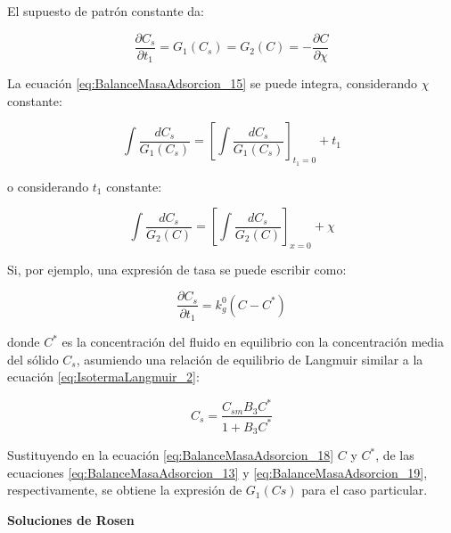 \documentclass[11pt]{book}
\begin{document}
El supuesto de patrón constante da:

\begin{equation}
    \label{eq:BalanceMasaAdsorcion_15}
    \frac{\partial C_s}{\partial t_1} = G_1 (C_s) = G_2(C) = - \frac{\partial C}{\partial \chi}
\end{equation}

La ecuación \ref{eq:BalanceMasaAdsorcion_15} se puede integra, considerando $\chi$ constante:

\begin{equation}
    \label{eq:BalanceMasaAdsorcion_16}
    \int \frac{dC_s}{G_1(C_s)} = \left[ \int \frac{dC_s}{G_1(C_s)} \right]_{t_1 = 0} + t_1
\end{equation}

o considerando $t_1$ constante:

\begin{equation}
    \label{eq:BalanceMasaAdsorcion_17}
    \int \frac{dC_s}{G_2(C)} = \left[ \int \frac{dC_s}{G_2(C)} \right]_{x = 0} + \chi
\end{equation}

Si, por ejemplo, una expresión de tasa se puede escribir como:

\begin{equation}
    \label{eq:BalanceMasaAdsorcion_18}
    \frac{\partial C_s}{\partial t_1} = k_g^0 (C - C^*)
\end{equation}

donde $C^*$ es la concentración del fluido en equilibrio con la concentración media del sólido $C_s$, asumiendo una relación de equilibrio de Langmuir similar a la ecuación \ref{eq:IsotermaLangmuir_2}:

\begin{equation}
    \label{eq:BalanceMasaAdsorcion_19}
    C_s = \frac{C_{sm} B_3 C^*}{1 + B_3 C^*}
\end{equation}

Sustituyendo en la ecuación \ref{eq:BalanceMasaAdsorcion_18} $C$ y $C^*$, de las ecuaciones \ref{eq:BalanceMasaAdsorcion_13} y \ref{eq:BalanceMasaAdsorcion_19}, respectivamente, se obtiene la expresión de $G_1(Cs)$ para el caso particular.

\textbf{Soluciones de Rosen}
\end{document}
